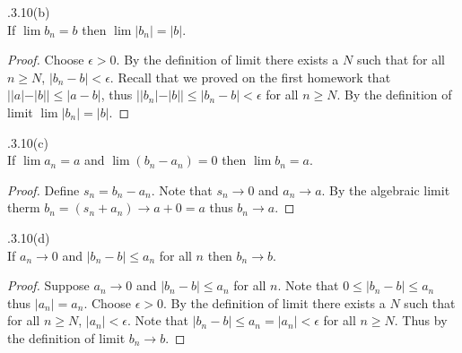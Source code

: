 \documentclass[12pt]{article}
\makeatletter
\theoremstyle{homework}
\newenvironment{exercise}[1]
{\def\@currentlabel{#1}\exercisecore}
{\endexercisecore}
\makeatother
\begin{document}
\begin{exercise}

2.3.10(b)\\
If $\lim b_n=b$ then $\lim |b_n|=|b|$.
\end{exercise}
\begin{proof}
Choose $\epsilon>0$.  By the definition of limit there exists a $N$ such that for all $n\geq N$, $|b_n-b|<\epsilon$.  Recall that we proved on the first homework that  $||a| - |b|| \leq |a - b|$, thus $||b_n|-|b||\leq |b_n-b|<\epsilon$ for all $n\geq N$.  By the definition of limit $\lim |b_n|=|b|$.
\end{proof}

\begin{exercise}

2.3.10(c)\\
If $\lim a_n=a$ and $\lim(b_n-a_n)=0$ then $\lim b_n=a$.
\end{exercise}
\begin{proof}
Define $s_n=b_n-a_n$.  Note that $s_n\rightarrow 0$ and $a_n\rightarrow a$.  By the algebraic limit therm $b_n=(s_n+a_n)\rightarrow a+0=a$ thus $b_n\rightarrow a$.
\end{proof}

\begin{exercise}

2.3.10(d)\\
If $a_n\rightarrow 0$ and $|b_n-b|\leq a_n$ for all $n$ then $b_n\rightarrow b$.
\end{exercise}
\begin{proof}
Suppose $a_n\rightarrow 0$ and $|b_n-b|\leq a_n$ for all $n$.  Note that $0\leq |b_n-b|\leq a_n$ thus $|a_n|=a_n$.  Choose $\epsilon>0$.  By the definition of limit there exists a $N$ such that for all $n\geq N$, $|a_n|<\epsilon$.  Note that $|b_n-b|\leq a_n=|a_n|<\epsilon$ for all $n\geq N$.  Thus by the definition of limit $b_n\rightarrow b$.
\end{proof}
\end{document}
